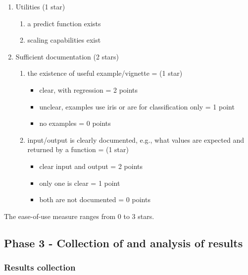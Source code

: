 \begin{enumerate}
\def\labelenumi{\arabic{enumi}.}
\tightlist
\item
  Utilities (1 star)

  \begin{enumerate}
  \def\labelenumii{\alph{enumii}.}
  \tightlist
  \item
    a predict function exists
  \item
    scaling capabilities exist
  \end{enumerate}
\item
  Sufficient documentation (2 stars)

  \begin{enumerate}
  \def\labelenumii{\alph{enumii}.}
  \tightlist
  \item
    the existence of useful example/vignette = (1 star)

    \begin{itemize}
    \tightlist
    \item
      clear, with regression = 2 points
    \item
      unclear, examples use iris or are for classification only = 1
      point
    \item
      no examples = 0 points
    \end{itemize}
  \item
    input/output is clearly documented, e.g., what values are expected
    and returned by a function = (1 star)

    \begin{itemize}
    \tightlist
    \item
      clear input and output = 2 points
    \item
      only one is clear = 1 point
    \item
      both are not documented = 0 points
    \end{itemize}
  \end{enumerate}
\end{enumerate}

The ease-of-use measure ranges from 0 to 3 stars.

\hypertarget{phase-3---collection-of-and-analysis-of-results}{%
\subsection{Phase 3 - Collection of and analysis of
results}\label{phase-3---collection-of-and-analysis-of-results}}

\hypertarget{results-collection}{%
\subsubsection{Results collection}\label{results-collection}}

